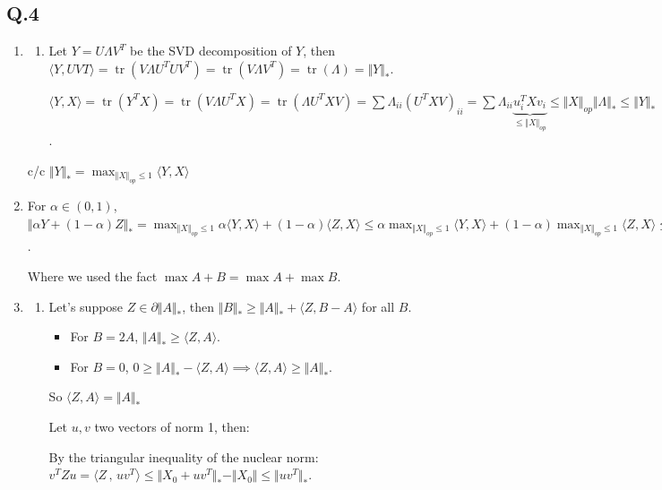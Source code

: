 \documentclass[12pt]{article}
\newcommand{\Q}[1]{\subsection*{Q.#1}}
\newenvironment{question}[1]
{\Q{#1}}{}
\newcommand{\norm}[1]{\Vert #1 \Vert}
\newcommand{\nucnorm}[1]{\Vert #1 \Vert_*}
\newcommand{\opnorm}[1]{\Vert #1 \Vert_{op}}
\newcommand{\inner}[2]{\langle #1 \, , \, #2 \rangle}
\DeclareMathOperator{\tr}{tr}
\begin{document}
\begin{question}{4}
  \begin{enumerate}
  \item[4.1] 
    \begin{enumerate}
    \item
      Let $Y = U\Lambda V^T$ be the SVD decomposition of $Y$,
      then $\langle Y, UVT\rangle  = \tr(V\Lambda U^TUV^T) = \tr(V\Lambda V^T) = \tr(\Lambda) = \Vert Y\Vert _*$.


      $\langle Y, X\rangle  = \tr(Y^TX) = \tr(V \Lambda U^TX) = \tr(\Lambda U^TXV) = \sum \Lambda_{ii} (U^TXV)_{ii}  = \sum \Lambda_{ii} \underbrace{u_i^TXv_i}_{\le \Vert X\Vert _{op}} \le  \Vert X\Vert _{op} \Vert \Lambda\Vert _* \le \Vert Y\Vert _*$.


    \end{enumerate}
    c/c $\Vert Y\Vert _* = \max_{\Vert X\Vert _{op} \le 1} \langle Y, X\rangle $

  \item[4.2]
    
    For $\alpha \in (0, 1)$,
    $\Vert \alpha Y + (1-\alpha)Z\Vert _* = \max_{\Vert X\Vert _{op} \le 1} \alpha \langle Y, X\rangle  + (1-\alpha) \langle Z, X\rangle  \le \alpha \max_{\Vert X\Vert _{op} \le 1} \langle Y, X\rangle  + (1-\alpha) \max_{\opnorm{X} \le 1} \langle Z, X\rangle  \le \alpha \Vert Y\Vert _* + (1-\alpha) \Vert Z\Vert _*$.
    
    Where we used the fact $\max A + B = \max A + \max B$.
    
  \item[4.3]
    \begin{enumerate}
    \item[$\Rightarrow$] Let's suppose $Z \in \partial \Vert A \Vert _*$, then $\norm{B}_* \ge \norm{A}_* + \langle Z, B - A\rangle $ for all $B$.
      \begin{itemize}
      \item For $B = 2A$, $\norm{A}_* \ge \langle Z, A\rangle $.  
      \item For $B = 0$,    $0 \ge \norm{A}_* - \langle Z, A\rangle \implies \langle Z,
        A\rangle \ge \norm{A}_*$.
      \end{itemize}
      So $ \langle Z, A\rangle = \norm{A}_*$

      Let $u, v$ two vectors of norm 1, then:
      
      By the triangular inequality of the nuclear norm:    $v^TZu = \inner{Z}{uv^T} \le \nucnorm{X_0 + uv^T} - \norm{X_0} \le \nucnorm{uv^T}$.
      

\end{enumerate}
\end{enumerate}
\end{question}
\end{document}
